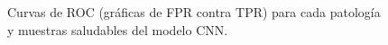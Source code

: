 \begin{figure}
    \begin{center}
    \end{center}
    \caption{Curvas de ROC (gráficas de FPR contra TPR) para cada patología y muestras saludables
    del modelo CNN.}
    \label{roc-curves-cnn}
\end{figure}

